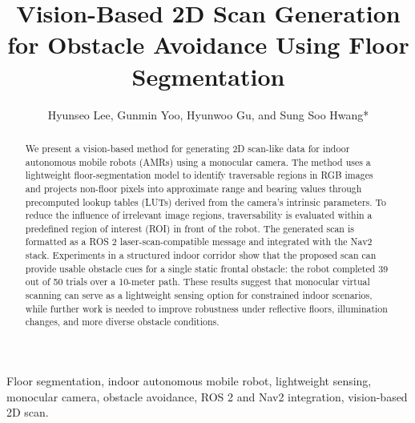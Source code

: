 \documentclass{IJCAS}
\begin{document}
\title{Vision-Based 2D Scan Generation for Obstacle Avoidance Using Floor Segmentation}

\author{Hyunseo Lee, Gunmin Yoo, Hyunwoo Gu, and Sung Soo Hwang*}

\begin{abstract}
We present a vision-based method for generating 2D scan-like data for indoor autonomous mobile robots (AMRs) using a monocular camera. The method uses a lightweight floor-segmentation model to identify traversable regions in RGB images and projects non-floor pixels into approximate range and bearing values through precomputed lookup tables (LUTs) derived from the camera's intrinsic parameters. To reduce the influence of irrelevant image regions, traversability is evaluated within a predefined region of interest (ROI) in front of the robot. The generated scan is formatted as a ROS 2 laser-scan-compatible message and integrated with the Nav2 stack. Experiments in a structured indoor corridor show that the proposed scan can provide usable obstacle cues for a single static frontal obstacle: the robot completed 39 out of 50 trials over a 10-meter path. These results suggest that monocular virtual scanning can serve as a lightweight sensing option for constrained indoor scenarios, while further work is needed to improve robustness under reflective floors, illumination changes, and more diverse obstacle conditions.
\end{abstract}

\begin{keywords}
Floor segmentation, indoor autonomous mobile robot, lightweight sensing, monocular camera, obstacle avoidance, ROS 2 and Nav2 integration, vision-based 2D scan.
\end{keywords}

\maketitle

\end{document}
